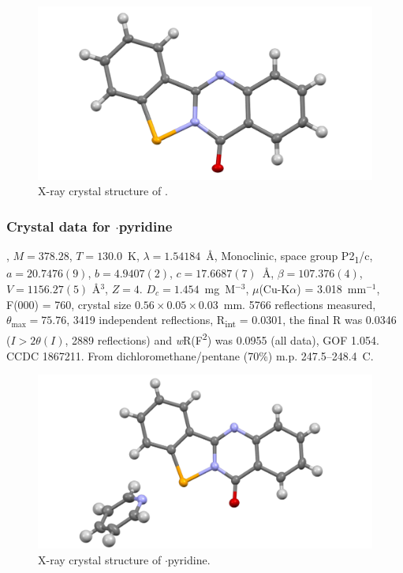 \begin{refsection}
    \begin{figure}
      \includegraphics[width=0.6\linewidth]{Figures/tetracycle-xtal.pdf}
      \caption{X-ray crystal structure of \texorpdfstring{}{C14H8N2OSe}.}
    \end{figure}
    
    \subsubsection{Crystal data for \texorpdfstring{$ \cdot $pyridine}{C19H13N3OSe}}
    , $M=378.28$, $T=130.0$~K, $\lambda=1.54184$~\AA, Monoclinic, space group P2\textsubscript{1}/c, $a = 20.7476(9)$, $b = 4.9407(2)$, $c = 17.6687(7)$~\AA, $\beta = 107.376(4)$\degree, $V = 1156.27(5)$ \AA$^{3}$, $Z = 4$.
    $D_{c} = 1.454$~mg~M$^{-3}$, $\mu$(Cu-K$\alpha$) = 3.018~mm$^{-1}$, F(000) = 760, crystal size $0.56 \times 0.05 \times 0.03$~mm.
    5766 reflections measured, $\theta_{\max} = 75.76$\degree, 3419 independent reflections, R\textsubscript{int} = 0.0301, the final R was 0.0346 ($I > 2\theta(I)$, 2889 reflections) and \textit{w}R(F\textsuperscript{2}) was 0.0955 (all data), GOF 1.054.
    CCDC 1867211.
    From dichloromethane/pentane (70\%) m.p. 247.5--248.4~\degree{}C.
    
    \begin{figure}
      \includegraphics[width=0.6\linewidth]{Figures/tetracycle-py-xtal.pdf}
      \caption{X-ray crystal structure of \texorpdfstring{$ \cdot $pyridine}{C19H13N3OSe}.}
    \end{figure}
    

\end{refsection}
